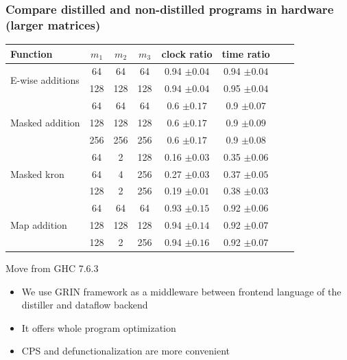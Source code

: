 \documentclass[xcolor=table]{beamer}
\begin{document}
\begin{frame}[fragile]\frametitle{Compare distilled and non-distilled programs in hardware (larger matrices)}

\centering
\begin{tabular}{ |l|c|c|c|c|c|c|c|} 
\hline
\rowcolor{LightBlue}
{Function} & {$m_1$} & {$m_2$} & {$m_3$} & {clock ratio} & {time ratio}\\
\hline
\multirow{2}{7em}{E-wise additions} & 64 & 64 & 64 & 0.94 $\pm 0.04$ & 0.94 $\pm 0.04$\\
{} & \rowcolor{LightRed} 128 & 128 & 128 & 0.94 $\pm 0.04$ & 0.95 $\pm 0.04$\\
\hline
\multirow{3}{7em}{Masked addition} & 64 & 64 & 64 & 0.6 $\pm 0.17$ & 0.9 $\pm 0.07$\\
{} & \rowcolor{LightRed} 128 & 128 & 128 & 0.6 $\pm 0.17$ & 0.9 $\pm 0.09$\\
{} & 256 & 256 & 256 & 0.6 $\pm 0.17$ & 0.9 $\pm 0.08$\\
\hline
\multirow{3}{7em}{Masked kron} & \rowcolor{LightRed} 64 & 2 & 128 & 0.16 $\pm 0.03$ & 0.35 $\pm 0.06$\\
{} & 64 & 4 & 256 & 0.27 $\pm 0.03$ & 0.37 $\pm 0.05$\\
{} & \rowcolor{LightRed} 128 & 2 & 256 & 0.19 $\pm 0.01$ & 0.38 $\pm 0.03$\\
\hline
\multirow{3}{7em}{Map addition} &  64 & 64 & 64 & 0.93 $\pm 0.15$ & 0.92 $\pm 0.06$\\
{} & \rowcolor{LightRed} 128 & 128 & 128 & 0.94 $\pm 0.14$ & 0.92 $\pm 0.07$\\
{} &  128 & 2 & 256 & 0.94 $\pm 0.16$ & 0.92 $\pm 0.07$\\
\hline
\end{tabular}



\end{frame}

\begin{frame}{Move from GHC 7.6.3}
    \begin{itemize}
        \item We use GRIN framework as a middleware between frontend language of the distiller and dataflow backend
        \vfill
        \item It offers whole program optimization
        \vfill
        \item CPS and defunctionalization are more convenient
    \end{itemize}
\end{frame}
\end{document}
